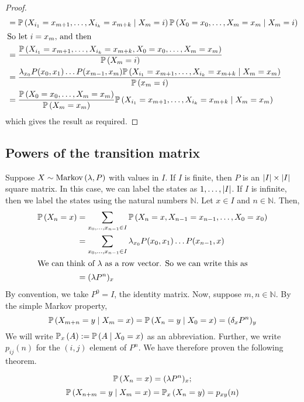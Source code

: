 \begin{proof}
\begin{align*}
		 & = \mathbb{P}\left({X_{i_1} = x_{m+1}, \dots, X_{i_k} = x_{m+k} \mid X_m = i}\right) \mathbb{P}\left({X_0 = x_0, \dots, X_m = x_m \mid X_m = i}\right)                          \\
		\intertext{So let \( i = x_m \), and then}
		 & = \frac{\mathbb{P}\left({X_{i_1} = x_{m+1}, \dots, X_{i_k} = x_{m+k}, X_0 = x_0, \dots, X_m = x_m}\right)}{\mathbb{P}\left({X_m = i}\right)}                                   \\
		 & = \frac{\lambda_{x_0} P(x_0, x_1) \dots P(x_{m-1}, x_m) \mathbb{P}\left({X_{i_1} = x_{m+1}, \dots, X_{i_k} = x_{m+k} \mid X_m = x_m}\right)}{\mathbb{P}\left({x_m = i}\right)} \\
		 & = \frac{\mathbb{P}\left({X_0 = x_0, \dots, X_m = x_m}\right)}{\mathbb{P}\left({X_m = x_m}\right)} \mathbb{P}\left({X_{i_1} = x_{m+1}, \dots, X_{i_k} = x_{m+k} \mid X_m = x_m}\right)
	\end{align*}
	which gives the result as required.
\end{proof}

\subsection{Powers of the transition matrix}
Suppose \( X \sim \operatorname{Markov}\left({\lambda, P}\right) \) with values in \( I \).
If \( I \) is finite, then \( P \) is an \( \abs{I} \times \abs{I} \) square matrix.
In this case, we can label the states as \( 1, \dots, \abs{I} \).
If \( I \) is infinite, then we label the states using the natural numbers \( \mathbb N \).
Let \( x \in I \) and \( n \in \mathbb N \).
Then,
\begin{align*}
	\mathbb{P}\left({X_n = x}\right) & = \sum_{x_0, \dots, x_{n-1} \in I} \mathbb{P}\left({X_n = x, X_{n-1} = x_{n-1}, \dots, X_0 = x_0}\right) \\
	               & = \sum_{x_0, \dots, x_{n-1} \in I} \lambda_{x_0} P(x_0, x_1) \dots P(x_{n-1}, x)       \\
	\intertext{We can think of \( \lambda \) as a row vector.
		So we can write this as}
	               & = (\lambda P^n)_x
\end{align*}
By convention, we take \( P^0 = I \), the identity matrix.
Now, suppose \( m, n \in \mathbb N \).
By the simple Markov property,
\[
	\mathbb{P}\left({X_{m+n} = y \mid X_m = x}\right) = \mathbb{P}\left({X_n = y \mid X_0 = x}\right) = ( \delta_x P^n )_y
\]
We will write \( \mathbb{P}_{x}\left({A}\right) := \mathbb{P}\left({A \mid X_0 = x}\right) \) as an abbreviation.
Further, we write \( p_{ij}(n) \) for the \( (i,j) \) element of \( P^n \).
We have therefore proven the following theorem.
\begin{theorem}
	\[
		\mathbb{P}\left({X_n = x}\right) = (\lambda P^n)_x;
	\]
	\[
		\mathbb{P}\left({X_{n+m} = y \mid X_m = x}\right) = \mathbb{P}_{x}\left({X_n = y}\right) = p_{xy}(n)
	\]
\end{theorem}

